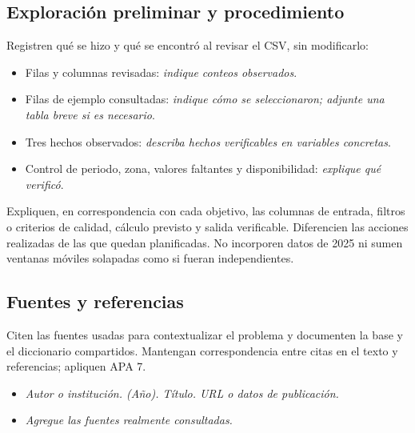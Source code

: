 \documentclass[11pt,a4paper]{article}
\newcommand{\completar}[1]{\textit{\textcolor{gris}{#1}}}
\begin{document}
\subsection{Exploración preliminar y procedimiento}
Registren qué se hizo y qué se encontró al revisar el CSV, sin modificarlo:
\begin{itemize}
  \item Filas y columnas revisadas: \completar{indique conteos observados}.
  \item Filas de ejemplo consultadas: \completar{indique cómo se seleccionaron; adjunte una tabla breve si es necesario}.
  \item Tres hechos observados: \completar{describa hechos verificables en variables concretas}.
  \item Control de periodo, zona, valores faltantes y disponibilidad: \completar{explique qué verificó}.
\end{itemize}

Expliquen, en correspondencia con cada objetivo, las columnas de entrada, filtros o criterios de calidad, cálculo previsto y salida verificable. Diferencien las acciones realizadas de las que quedan planificadas. No incorporen datos de 2025 ni sumen ventanas móviles solapadas como si fueran independientes.

\subsection{Fuentes y referencias}
Citen las fuentes usadas para contextualizar el problema y documenten la base y el diccionario compartidos. Mantengan correspondencia entre citas en el texto y referencias; apliquen APA 7.

\begin{itemize}
  \item \completar{Autor o institución. (Año). Título. URL o datos de publicación.}
  \item \completar{Agregue las fuentes realmente consultadas.}
\end{itemize}
\end{document}
